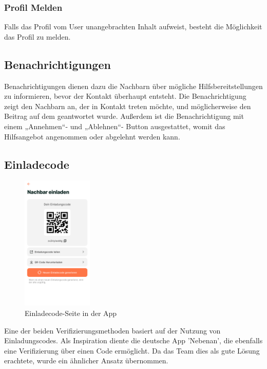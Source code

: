 \subsubsection{Profil Melden}
Falls das Profil vom User unangebrachten Inhalt aufweist, besteht die Möglichkeit das Profil zu melden.

\subsection{Benachrichtigungen}
Benachrichtigungen dienen dazu die Nachbarn über mögliche
Hilfsbereitstellungen zu informieren, bevor der Kontakt
überhaupt entsteht. Die Benachrichtigung zeigt den Nachbarn
an, der in Kontakt treten möchte, und möglicherweise den
Beitrag auf dem geantwortet wurde. Außerdem ist die
Benachrichtigung mit einem „Annehmen“- und „Ablehnen“-
Button ausgestattet, womit das Hilfsangebot angenommen oder
abgelehnt werden kann.

\subsection{Einladecode}

\begin{figure}[H]
  \centering
  \includegraphics[width=0.3\textwidth]{pics/einladecode-page.png}
  \caption{Einladecode-Seite in der App}
  \label{fig:einladecode}
\end{figure}
Eine der beiden Verifizierungsmethoden basiert auf der Nutzung von Einladungscodes. Als Inspiration diente die deutsche App 'Nebenan', die ebenfalls eine Verifizierung über einen Code ermöglicht. Da das Team dies als gute Lösung erachtete, wurde ein ähnlicher Ansatz übernommen.

